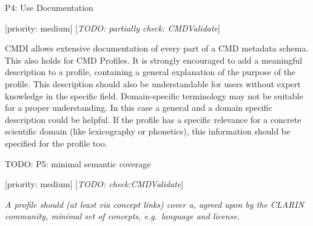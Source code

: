 P4: Use Documentation

{[}priority: medium{]} {[}\emph{TODO: partially check: CMDValidate}{]}

CMDI allows extensive documentation of every part of a CMD metadata
schema. This also holds for CMD Profiles. It is strongly encouraged to
add a meaningful description to a profile, containing a general
explanation of the purpose of the profile. This description should also
be understandable for users without expert knowledge in the specific
field. Domain-specific terminology may not be suitable for a proper
understanding. In this case a general and a domain specific description
could be helpful. If the profile has a specific relevance for a concrete
scientific domain (like lexicography or phonetics), this information
should be specified for the profile too.

TODO: P5: minimal semantic coverage

{[}priority: medium{]} {[}\emph{TODO: check:CMDValidate}{]}

\emph{A profile should (at least via concept links) cover a, agreed upon
by the CLARIN community, minimal set of concepts, e.g.~language and
license.}
